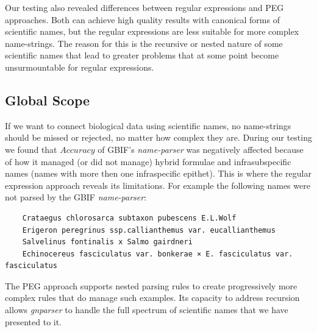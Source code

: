 \documentclass{bmcart}
\begin{document}
Our testing also revealed differences between regular expressions and PEG
approaches. Both can achieve high quality results with canonical forms of
scientific names, but the regular expressions are less suitable for more
complex name-strings. The reason for this is the recursive or nested nature of
some scientific names that lead to greater problems that at some point become
unsurmountable for regular expressions.

\subsection*{Global Scope}

If we want to connect biological data using scientific names, no name-strings
should be missed or rejected, no matter how complex they are. During our
testing we found that $Accuracy$ of GBIF's \textit{name-parser} was negatively
affected because of how it managed (or did not manage) hybrid formulae and
infrasubspecific names (names with more then one infraspecific epithet). This
is where the regular expression approach reveals its limitations.  For example
the following names were not parsed by the GBIF \textit{name-parser}:

\vspace{0.5cm}

\begin{verbatim}
    Crataegus chlorosarca subtaxon pubescens E.L.Wolf
    Erigeron peregrinus ssp.callianthemus var. eucallianthemus
    Salvelinus fontinalis x Salmo gairdneri
    Echinocereus fasciculatus var. bonkerae × E. fasciculatus var. fasciculatus
\end{verbatim}

\vspace{0.5cm}

The PEG approach supports nested parsing rules to create progressively more
complex rules that do manage such examples. Its capacity to address recursion
allows \textit{gnparser} to handle the full spectrum of scientific names that
we have presented to it.
\end{document}
